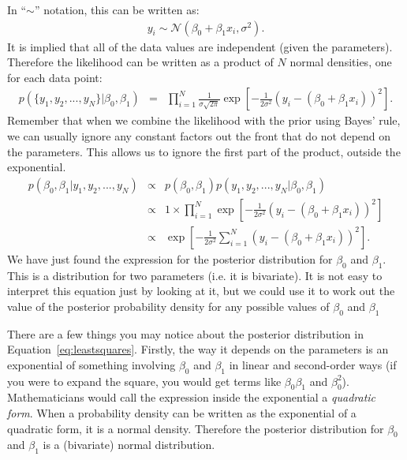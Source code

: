 In ``$\sim$'' notation, this can be written as:
\begin{eqnarray}
y_i \sim \mathcal{N}(\beta_0 + \beta_1 x_i, \sigma^2).
\end{eqnarray}
It is implied that all of the data values are independent (given the
parameters). Therefore the likelihood can be written as a product of $N$
normal densities, one for each data point:
\begin{eqnarray}
p(\{y_1, y_2, ..., y_N\}|\beta_0, \beta_1) &=& \prod_{i=1}^N \frac{1}{\sigma\sqrt{2\pi}}
\exp\left[-\frac{1}{2\sigma^2}\left(y_i - (\beta_0 + \beta_1 x_i)\right)^2\right].
\end{eqnarray}
Remember that when we combine the likelihood with the prior using Bayes' rule,
we can usually ignore any constant factors out the front that do not depend on
the parameters. This allows us to ignore the first part of the product, outside
the exponential.
\begin{eqnarray}
p(\beta_0, \beta_1 | y_1, y_2, ..., y_N) &\propto& p(\beta_0, \beta_1)
p(y_1, y_2, ..., y_N|\beta_0, \beta_1)\\
&\propto& 1 \times \prod_{i=1}^N \exp\left[-\frac{1}{2\sigma^2}\left(y_i - (\beta_0 + \beta_1 x_i)\right)^2\right]\\
&\propto& \exp\left[-\frac{1}{2\sigma^2}\sum_{i=1}^N\left(y_i - (\beta_0 + \beta_1 x_i)\right)^2\right].
\label{eq:leastsquares}
\end{eqnarray}
We have just found the expression for the posterior distribution for $\beta_0$
and $\beta_1$. This is a distribution for two parameters (i.e. it is bivariate).
It is not easy to interpret this equation just by
looking at it, but we could use it to work out the value of the posterior
probability density for any possible values of $\beta_0$ and $\beta_1$

There are a few things you may notice about the posterior distribution in
Equation~\ref{eq:leastsquares}. Firstly, the way it depends on the parameters
is an exponential of something involving $\beta_0$
and $\beta_1$ in linear and second-order ways (if you were to expand the square,
you would get terms like $\beta_0\beta_1$ and $\beta_0^2$). Mathematicians would
call the expression inside the exponential a {\it quadratic form}. When a
probability density can be written as the exponential of a quadratic form, it
is a normal density. Therefore the posterior distribution for $\beta_0$ and
$\beta_1$ is a (bivariate) normal distribution.

